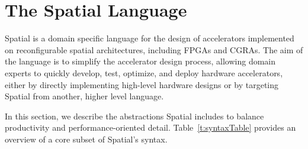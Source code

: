 \section{The Spatial Language}
\label{language}

Spatial is a domain specific language for the design of accelerators implemented on reconfigurable spatial architectures, including FPGAs and CGRAs.
The aim of the language is to simplify the accelerator design process,
allowing domain experts to quickly develop, test, optimize, and deploy hardware accelerators, either by
directly implementing high-level hardware designs or by targeting Spatial from another, higher level language.

In this section, we describe the abstractions Spatial includes to balance productivity and performance-oriented detail.
Table~\ref{t:syntaxTable} provides an overview of a core subset of Spatial's syntax.









